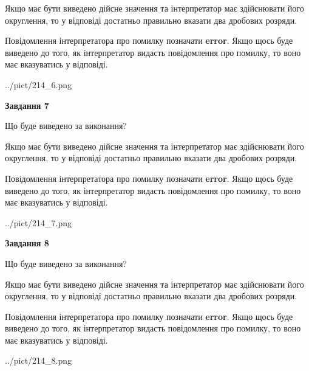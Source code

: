 \documentclass[12pt, ukrainian]{article}
\begin{document}
{\begin {Large}
Якщо має бути виведено дійсне значення та інтерпретатор має здійснювати його округлення, 
то у відповіді достатньо правильно вказати два дробових розряди.

Повідомлення інтерпретатора про помилку позначати \textbf{error}.
Якщо щось буде виведено до того, як інтерпретатор видасть повідомлення про помилку, 
то воно має вказуватись у відповіді. \par

\begin{center}
	{../pict/214_6.png}
\end{center}
\newpage

{\begin {center}\textbf{Завдання 7}\end {center}}\par
Що буде виведено за виконання? \par

Якщо має бути виведено дійсне значення та інтерпретатор має здійснювати його округлення, 
то у відповіді достатньо правильно вказати два дробових розряди.

Повідомлення інтерпретатора про помилку позначати \textbf{error}.
Якщо щось буде виведено до того, як інтерпретатор видасть повідомлення про помилку, 
то воно має вказуватись у відповіді. \par

\begin{center}
	{../pict/214_7.png}
\end{center}
\newpage

{\begin {center}\textbf{Завдання 8}\end {center}}\par
Що буде виведено за виконання? \par

Якщо має бути виведено дійсне значення та інтерпретатор має здійснювати його округлення, 
то у відповіді достатньо правильно вказати два дробових розряди.

Повідомлення інтерпретатора про помилку позначати \textbf{error}.
Якщо щось буде виведено до того, як інтерпретатор видасть повідомлення про помилку, 
то воно має вказуватись у відповіді. \par

\begin{center}
	{../pict/214_8.png}
\end{center}
\newpage


\end{Large}}
\end{document}
